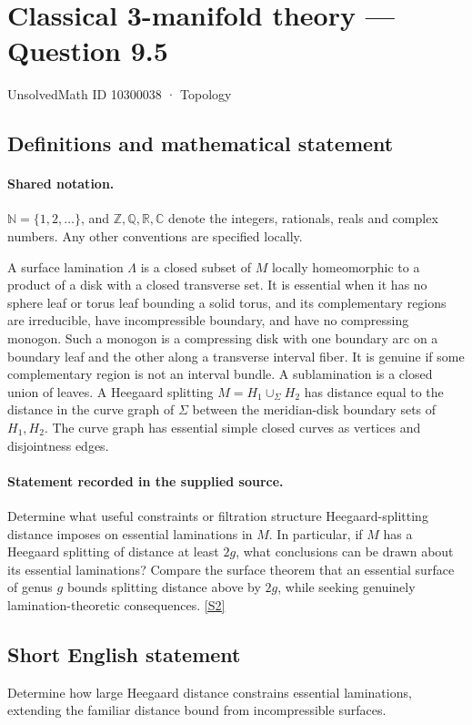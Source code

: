 \documentclass[11pt]{article}
\newcommand{\sref}[2]{\hyperlink{source:#1:#2}{[S#2]}}
\begin{document}
\setcounter{section}{10300037}
\section{Classical 3-manifold theory — Question 9.5}\label{10300038}
{\small\sffamily UnsolvedMath ID 10300038 · Topology}
\subsection{Definitions and mathematical statement}

\paragraph{Shared notation.}$\mathbb N=\{1,2,\ldots\}$, and $\mathbb Z,\mathbb Q,\mathbb R,\mathbb C$ denote the integers, rationals, reals and complex numbers. Any other conventions are specified locally.


A surface lamination $\Lambda$ is a closed subset of $M$ locally homeomorphic to a product of a disk with a closed transverse set. It is essential when it has no sphere leaf or torus leaf bounding a solid torus, and its complementary regions are irreducible, have incompressible boundary, and have no compressing monogon. Such a monogon is a compressing disk with one boundary arc on a boundary leaf and the other along a transverse interval fiber. It is genuine if some complementary region is not an interval bundle. A sublamination is a closed union of leaves. A Heegaard splitting $M=H_1\cup_\Sigma H_2$ has distance equal to the distance in the curve graph of $\Sigma$ between the meridian-disk boundary sets of $H_1,H_2$. The curve graph has essential simple closed curves as vertices and disjointness edges.
\paragraph{Statement recorded in the supplied source.}
Determine what useful constraints or filtration structure Heegaard-splitting distance imposes on essential laminations in $M$. In particular, if $M$ has a Heegaard splitting of distance at least $2g$, what conclusions can be drawn about its essential laminations? Compare the surface theorem that an essential surface of genus $g$ bounds splitting distance above by $2g$, while seeking genuinely lamination-theoretic consequences. \sref{10300038}{2}
\subsection{Short English statement}
Determine how large Heegaard distance constrains essential laminations, extending the familiar distance bound from incompressible surfaces.
\end{document}
